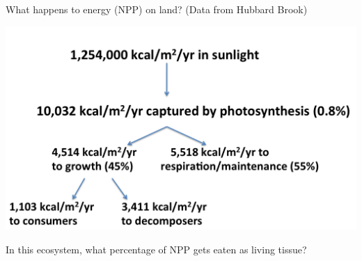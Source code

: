 \begin{frame}[t]
    \begin{adjustwidth}{-2em}{-1.5em}
        What happens to energy (NPP) on land? (Data from Hubbard Brook)

        \includegraphics[width=\linewidth]{energy-transfer-cascade.png}

        In this ecosystem, what percentage of NPP gets eaten as living tissue?
        

    \end{adjustwidth}
\end{frame}

